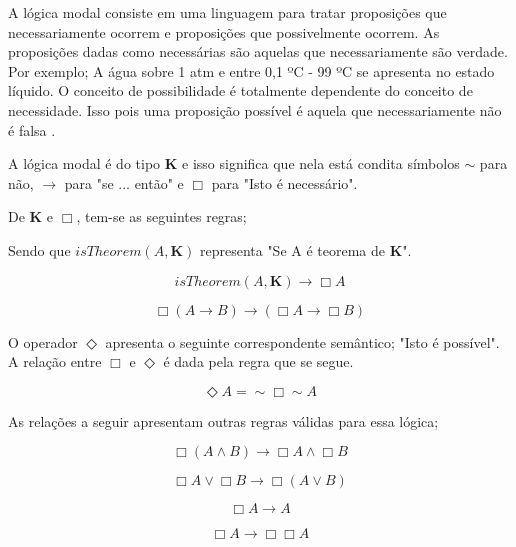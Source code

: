 A lógica modal consiste em uma linguagem para tratar proposições que necessariamente ocorrem e proposições que possivelmente ocorrem. As proposições dadas como necessárias são aquelas que necessariamente são verdade. Por exemplo; A água sobre 1 atm e entre 0,1 ºC - 99 ºC se apresenta no estado líquido. O conceito de possibilidade é totalmente dependente do conceito de necessidade. Isso pois uma proposição possível é aquela que necessariamente não é falsa \cite{modallogic}. 

A lógica modal é do tipo \textbf{K} e isso significa que nela está condita símbolos $ \sim $ para não, $ \rightarrow$ para "se ... então" e $\Box$ para "Isto é necessário". 

De \textbf{K} e $\Box$, tem-se as seguintes regras;

Sendo que $isTheorem(A,\textbf{K})$ representa "Se A é teorema de \textbf{K}". 

\begin{equation} 
isTheorem(A,\textbf{K}) \rightarrow \Box A
\end{equation}
\label{ktheorema}

\begin{equation} 
 \Box (A \rightarrow B) \rightarrow (\Box A \rightarrow \Box B) 
\end{equation}
\label{boxdist}

O operador $\Diamond$ apresenta o seguinte correspondente semântico; "Isto é possível". A relação entre $\Box$ e $\Diamond$ é dada pela regra que se segue.

\begin{equation} 
 \Diamond A = \sim\Box\sim A
\end{equation}
\label{dianotboxnota}

As relações a seguir apresentam outras regras válidas para essa lógica;

\begin{equation} 
 \Box (A \wedge B)  \rightarrow \Box A \wedge \Box B
\end{equation}
\label{boxand}

\begin{equation} 
 \Box A \vee \Box B \rightarrow \Box (A \vee B)
\end{equation}
\label{boxaor}

\begin{equation} 
 \Box A \rightarrow A
\end{equation}
\label{boxtoa}

\begin{equation} 
    \Box A \rightarrow \Box\Box A
\end{equation}
\label{aboxbox}

